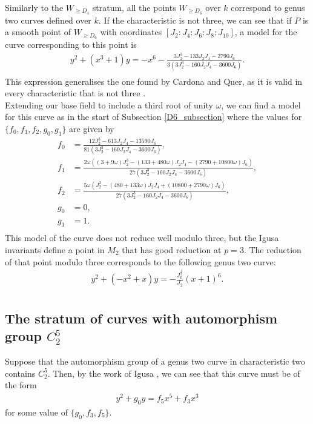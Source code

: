 \documentclass{amsart}
\numberwithin{equation}{section}
\theoremstyle{definition}
\theoremstyle{remark}
\begin{document}
Similarly to the $W_{\geq D_4}$ stratum, all the points $W_{\geq D_6}$ over $k$ correspond to genus two curves defined over $k$. If the characteristic is not three, we can see that if $P$ is a smooth point of $W_{\geq D_6}$ with coordinates $[J_2:J_4:J_6:J_8:J_{10}]$, a model for the curve corresponding to this point is
\begin{align*}
y^2+(x^3+1)y=-x^6-\frac{3 J_2^3 - 133 J_2 J_4 - 2790 J_6}{3 (3 J_2^3 - 160 J_2 J_4 - 3600 J_6)}.\\
\end{align*}
This expression generalises the one found by Cardona and Quer, as it is valid in every characteristic that is not three \cite[Proposition 2.1]{Cardona2007CurvesD12}.\\

Extending our base field to include a third root of unity $\omega$, we can find a model for this curve as in the start of Subsection \ref{D6_subsection} where the values for $\{f_0,f_1,f_2,g_0,g_1\}$ are given by
\begin{align*}
f_0&=\frac{12 J_2^3 - 613 J_2 J_4 - 13590 J_6}{81(3 J_2^3 - 160 J_2 J_4 - 3600 J_6)},\\
f_1&=\frac{2 \omega ((3 + 9 \omega)J_2^3-(133 + 480 \omega)J_2 J_4-(2790+10800\omega)J_6)}{27(3 J_2^3 - 160 J_2 J_4 - 3600 J_6)},\\
f_2&=\frac{5\omega(J_2^3-(480+133\omega)J_2J_4+(10800+2790\omega)J_6)}{27(3 J_2^3 - 160 J_2 J_4 - 3600 J_6)},\\
g_0&=0,\\
g_1&=1.\\
\end{align*}
This model of the curve does not reduce well modulo three, but the Igusa invariants define a point in $M_2$ that has good reduction at $p=3$. The reduction of that point modulo three corresponds to the following genus two curve:
\begin{align*}
y^2+(-x^2+x)y=-\frac{J_6^\frac{1}{3}}{J_2}(x+1)^6.\\
\end{align*}


\subsection{The stratum of curves with automorphism group \texorpdfstring{$C_2^5$}{C2⁵}} \label{C2^5_subsection}
Suppose that the automorphism group of a genus two curve in characteristic two contains $C_2^5$. Then, by the work of Igusa \cite{Igusa1960ArithmeticTwo}, we can see that this curve must be of the form
\begin{align*}
y^2+g_0y=f_5x^5+f_3 x^3
\end{align*}
for some value of $\{g_0,f_3,f_5\}$.\\
\end{document}
